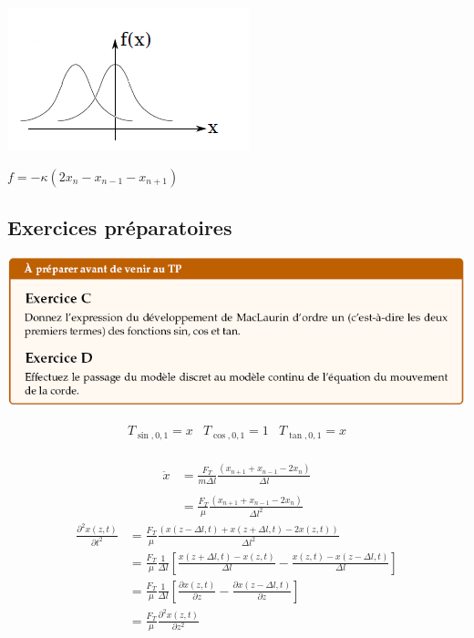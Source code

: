 \documentclass	[11pt, a4paper, openany]{book}
\begin{document}
			\begin{center}
			\includegraphics[scale=0.85]{prepa/Q16.png}
			\end{center}
			
			
			$f=-\kappa(2x_n-x_{n-1}-x_{n+1})$
			
			
			
			\subsection{Exercices préparatoires}
				
			\begin{center}
			\includegraphics[scale=0.85]{prepa/Ondes-CD.png}\\
			\end{center}
			
			$$\begin{array}{lcr} T_{\sin,0,1}=x & T_{\cos,0,1}=1 & T_{\tan,0,1}=x\end{array}$$ \\
			\begin{align*}
			\ddot{x} & =\frac{F_T}{m\Delta l}\frac{(x_{n+1}+x_{n-1}-2x_n)}{\Delta l}\\\\
			& =\frac{F_T}{\mu}\frac{(x_{n+1}+x_{n-1}-2x_n)}{\Delta l^2}\end{align*}
			\begin{align*}
			\frac{\partial^2 x(z,t)}{\partial t^2} & =\frac{F_T}{\mu}\frac{(x(z-\Delta l,t)+x(z+\Delta l, t)-2x(z,t))}{\Delta l^2}\\
			& =\frac{F_T}{\mu}\frac{1}{\Delta l}\left[\frac{x(z+\Delta l,t)-x(z,t)}{\Delta l}-\frac{x(z,t)-x(z-\Delta l,t)}{\Delta l}\right]\\
			& =\frac{F_T}{\mu}\frac{1}{\Delta l}\left[\frac{\partial x(z,t)}{\partial z}-\frac{\partial x(z-\Delta l,t)}{\partial z}\right]\\
			& =\frac{F_T}{\mu}\frac{\partial^2x(z,t)}{\partial z^2}
		\end{align*}
		
\end{document}
